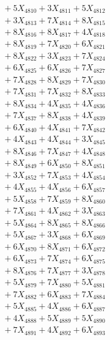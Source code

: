 \documentclass[a4paper,10pt]{article}
\begin{document}
{\begin{align}
&\;  + 5 X_{4810} + 3 X_{4811} + 5 X_{4812} \\[0.3ex]
&\;  + 3 X_{4813} + 7 X_{4814} + 8 X_{4815} \\[0.3ex]
&\;  + 8 X_{4816} + 8 X_{4817} + 4 X_{4818} \\[0.3ex]
&\;  + 8 X_{4819} + 7 X_{4820} + 6 X_{4821} \\[0.3ex]
&\;  + 8 X_{4822} + 3 X_{4823} + 7 X_{4824} \\[0.3ex]
&\;  + 6 X_{4825} + 6 X_{4826} + 7 X_{4827} \\[0.3ex]
&\;  + 7 X_{4828} + 8 X_{4829} + 7 X_{4830} \\[0.3ex]
&\;  + 7 X_{4831} + 7 X_{4832} + 8 X_{4833} \\[0.3ex]
&\;  + 8 X_{4834} + 4 X_{4835} + 4 X_{4836} \\[0.3ex]
&\;  + 7 X_{4837} + 8 X_{4838} + 4 X_{4839} \\[0.5ex]\allowbreak
&\;  + 6 X_{4840} + 4 X_{4841} + 7 X_{4842} \\[0.3ex]
&\;  + 4 X_{4843} + 4 X_{4844} + 3 X_{4845} \\[0.3ex]
&\;  + 8 X_{4846} + 7 X_{4847} + 4 X_{4848} \\[0.3ex]
&\;  + 8 X_{4849} + 6 X_{4850} + 8 X_{4851} \\[0.3ex]
&\;  + 3 X_{4852} + 7 X_{4853} + 4 X_{4854} \\[0.3ex]
&\;  + 4 X_{4855} + 4 X_{4856} + 6 X_{4857} \\[0.3ex]
&\;  + 5 X_{4858} + 7 X_{4859} + 8 X_{4860} \\[0.3ex]
&\;  + 7 X_{4861} + 4 X_{4862} + 3 X_{4863} \\[0.3ex]
&\;  + 5 X_{4864} + 8 X_{4865} + 8 X_{4866} \\[0.3ex]
&\;  + 5 X_{4867} + 3 X_{4868} + 6 X_{4869} \\[0.5ex]\allowbreak
&\;  + 6 X_{4870} + 8 X_{4871} + 6 X_{4872} \\[0.3ex]
&\;  + 6 X_{4873} + 7 X_{4874} + 6 X_{4875} \\[0.3ex]
&\;  + 8 X_{4876} + 7 X_{4877} + 3 X_{4878} \\[0.3ex]
&\;  + 5 X_{4879} + 7 X_{4880} + 5 X_{4881} \\[0.3ex]
&\;  + 7 X_{4882} + 6 X_{4883} + 7 X_{4884} \\[0.3ex]
&\;  + 5 X_{4885} + 4 X_{4886} + 6 X_{4887} \\[0.3ex]
&\;  + 4 X_{4888} + 5 X_{4889} + 5 X_{4890} \\[0.3ex]
&\;  + 7 X_{4891} + 4 X_{4892} + 6 X_{4893} \\[0.3ex]

\end{align}}
\end{document}
